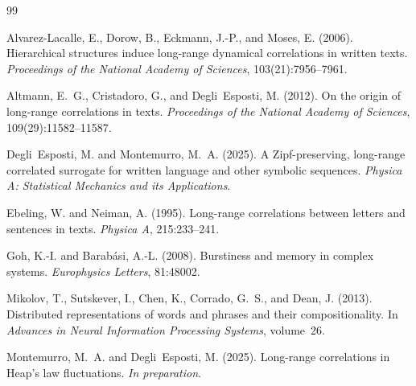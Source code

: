 \documentclass[12pt,a4paper]{article}
\newcommand{\TODO}[1]{\textcolor{red}{\textbf{[TODO: #1]}}}
\newcommand{\NOTE}[1]{\textcolor{blue}{\textbf{[NOTE: #1]}}}
\begin{document}
%



\begin{thebibliography}{99}

Alvarez-Lacalle, E., Dorow, B., Eckmann, J.-P., and Moses, E. (2006).
\newblock Hierarchical structures induce long-range dynamical correlations in written texts.
\newblock \emph{Proceedings of the National Academy of Sciences},
  103(21):7956--7961.

Altmann, E.~G., Cristadoro, G., and Degli~Esposti, M. (2012).
\newblock On the origin of long-range correlations in texts.
\newblock \emph{Proceedings of the National Academy of Sciences},
  109(29):11582--11587.

Degli~Esposti, M. and Montemurro, M.~A. (2025).
\newblock A {Z}ipf-preserving, long-range correlated surrogate for
  written language and other symbolic sequences.
\newblock \emph{Physica A: Statistical Mechanics and its Applications}.

Ebeling, W. and Neiman, A. (1995).
\newblock Long-range correlations between letters and sentences in
  texts.
\newblock \emph{Physica A}, 215:233--241.

Goh, K.-I. and Barab{\'a}si, A.-L. (2008).
\newblock Burstiness and memory in complex systems.
\newblock \emph{Europhysics Letters}, 81:48002.

Mikolov, T., Sutskever, I., Chen, K., Corrado, G.~S., and Dean, J.
  (2013).
\newblock Distributed representations of words and phrases and their
  compositionality.
\newblock In \emph{Advances in Neural Information Processing Systems},
  volume~26.

Montemurro, M.~A. and Degli~Esposti, M. (2025).
\newblock Long-range correlations in {H}eap's law fluctuations.
\newblock \emph{In preparation}.


\end{thebibliography}
\end{document}

